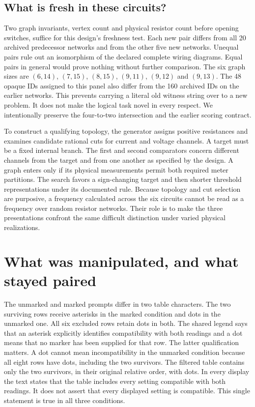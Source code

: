 \documentclass[12pt,letterpaper]{article}
\begin{document}
\subsection{What is fresh in these circuits?}

Two graph invariants, vertex count and physical resistor count before opening switches, suffice for this design's freshness test. Each new pair differs from all 20 archived predecessor networks and from the other five new networks. Unequal pairs rule out an isomorphism of the declared complete wiring diagrams. Equal pairs in general would prove nothing without further comparison. The six graph sizes are $(6,14)$, $(7,15)$, $(8,15)$, $(9,11)$, $(9,12)$ and $(9,13)$. The 48 opaque IDs assigned to this panel also differ from the 160 archived IDs on the earlier networks. This prevents carrying a literal old witness string over to a new problem. It does not make the logical task novel in every respect. We intentionally preserve the four-to-two intersection and the earlier scoring contract.

To construct a qualifying topology, the generator assigns positive resistances and examines candidate rational cuts for current and voltage channels. A target must be a fixed internal branch. The first and second comparators concern different channels from the target and from one another as specified by the design. A graph enters only if its physical measurements permit both required meter partitions. The search favors a sign-changing target and then shorter threshold representations under its documented rule. Because topology and cut selection are purposive, a frequency calculated across the six circuits cannot be read as a frequency over random resistor networks. Their role is to make the three presentations confront the same difficult distinction under varied physical realizations.

\section{What was manipulated, and what stayed paired}

The unmarked and marked prompts differ in two table characters. The two surviving rows receive asterisks in the marked condition and dots in the unmarked one. All six excluded rows retain dots in both. The shared legend says that an asterisk explicitly identifies compatibility with both readings and a dot means that no marker has been supplied for that row. The latter qualification matters. A dot cannot mean incompatibility in the unmarked condition because all eight rows have dots, including the two survivors. The filtered table contains only the two survivors, in their original relative order, with dots. In every display the text states that the table includes every setting compatible with both readings. It does not assert that every displayed setting is compatible. This single statement is true in all three conditions.
\end{document}
